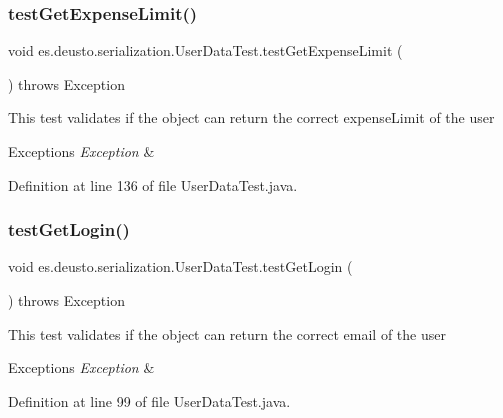 \subsubsection{\texorpdfstring{test\+Get\+Expense\+Limit()}{testGetExpenseLimit()}}
{\footnotesize\ttfamily void es.\+deusto.\+serialization.\+User\+Data\+Test.\+test\+Get\+Expense\+Limit (\begin{DoxyParamCaption}{ }\end{DoxyParamCaption}) throws Exception}

This test validates if the object can return the correct expense\+Limit of the user 
\begin{DoxyExceptions}{Exceptions}
{\em Exception} & \\
\hline
\end{DoxyExceptions}


Definition at line 136 of file User\+Data\+Test.\+java.

\mbox{\label{classes_1_1deusto_1_1serialization_1_1_user_data_test_a7bee65127b733f7cd3e57839fda83723}} 
\subsubsection{\texorpdfstring{test\+Get\+Login()}{testGetLogin()}}
{\footnotesize\ttfamily void es.\+deusto.\+serialization.\+User\+Data\+Test.\+test\+Get\+Login (\begin{DoxyParamCaption}{ }\end{DoxyParamCaption}) throws Exception}

This test validates if the object can return the correct email of the user 
\begin{DoxyExceptions}{Exceptions}
{\em Exception} & \\
\hline
\end{DoxyExceptions}


Definition at line 99 of file User\+Data\+Test.\+java.

\mbox{\label{classes_1_1deusto_1_1serialization_1_1_user_data_test_a7219ec968af5364963f2868497d8a6af}} 

